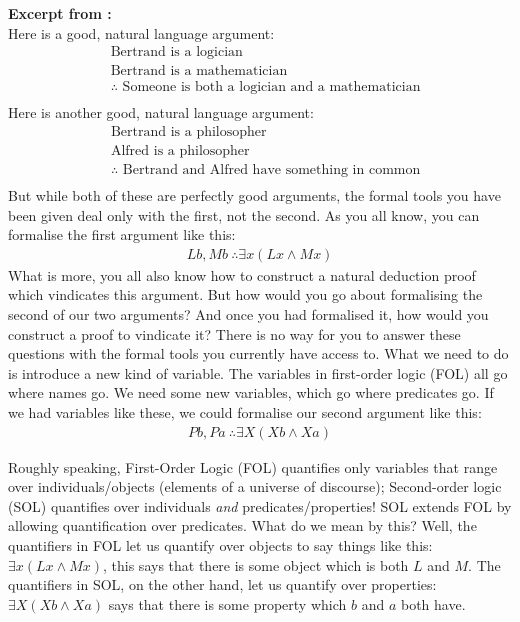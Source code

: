 \begin{tcolorbox}
    \textbf{Excerpt from \cite{truemanSOL}:}\\
    Here is a good, natural language argument:
\begin{align*}
    &\text{Bertrand is a logician}\\
    &\text{Bertrand is a mathematician}\\
    &\therefore \text{ Someone is both a logician and a mathematician}\\
\end{align*}
Here is another good, natural language argument:
\begin{align*}
   &\text{Bertrand is a philosopher}\\
   &\text{Alfred is a philosopher}\\
   &\therefore \text{ Bertrand and Alfred have something in common} \\
\end{align*}
But while both of these are perfectly good arguments, the formal tools you have been given deal only with the first, not the second. As you all know, you can formalise the first argument like this:
\begin{align*}
    Lb, Mb \ \therefore \exists x(Lx\wedge Mx)
\end{align*}
What is more, you all also know how to construct a natural deduction proof which vindicates this argument. But how would you go about formalising the second of our two arguments? And once you had 
formalised it, how would you construct a proof to vindicate it? There is no way for you to answer these questions with the formal tools you currently have access to. What we need to do is introduce 
a new kind of variable. The variables in first-order logic (FOL) all go where names go. We need some new variables, which go where predicates go. If we had variables like these, we could formalise our second
argument like this:
\begin{align*}
    Pb, Pa \ \therefore \exists X(Xb\wedge Xa)
\end{align*}
\end{tcolorbox}

Roughly speaking,  First-Order Logic (FOL) quantifies only variables that range over individuals/objects (elements of a universe of discourse); Second-order logic (SOL) quantifies over individuals \textit{and} predicates/properties! 
SOL extends FOL by allowing quantification over predicates. What do we mean by this? Well, the quantifiers in FOL let us quantify over objects to say things like this: \(\exists x(Lx\wedge Mx)\), this says
that there is some object which is both $L$ and $M$. The quantifiers in SOL, on the other hand, let us quantify over properties: \(\exists X(Xb\wedge Xa)\) says that there is
some property which $b$ and $a$ both have.

